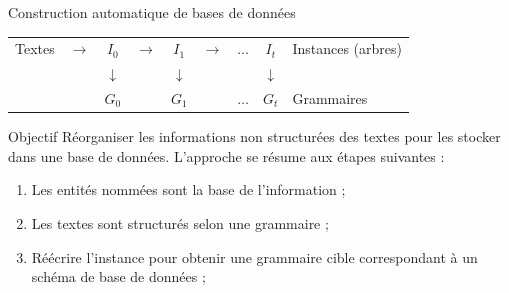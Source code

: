 \begin{frame}{Construction automatique de bases de données}
    \centering
    \begin{adjustbox}{max width=.8\linewidth}
        \begin{tabular}{cccccccc|l}
            Textes & $\rightarrow$ & $I_0$        & $\rightarrow$ & $ I_1$       & $\rightarrow$ & $ \dots$ & $I_t$        & Instances (arbres) \\
                   &               & $\downarrow$ &               & $\downarrow$ &               &          & $\downarrow$ &                    \\
                   &               & $G_0$        &               & $G_1$        &               & $ \dots$ & $G_t$        & Grammaires         \\
        \end{tabular}
    \end{adjustbox}

    \vfill

    \begin{block}{Objectif}
        Réorganiser les informations non structurées des textes pour les stocker dans une base de données.
        L'approche se résume aux étapes suivantes :
        \begin{enumerate}
            \item Les entités nommées sont la base de l'information ;
            \item Les textes sont structurés selon une grammaire ;
            \item Réécrire l'instance pour obtenir une grammaire cible correspondant à un schéma de base de données ;
        \end{enumerate}
    \end{block}
\end{frame}

